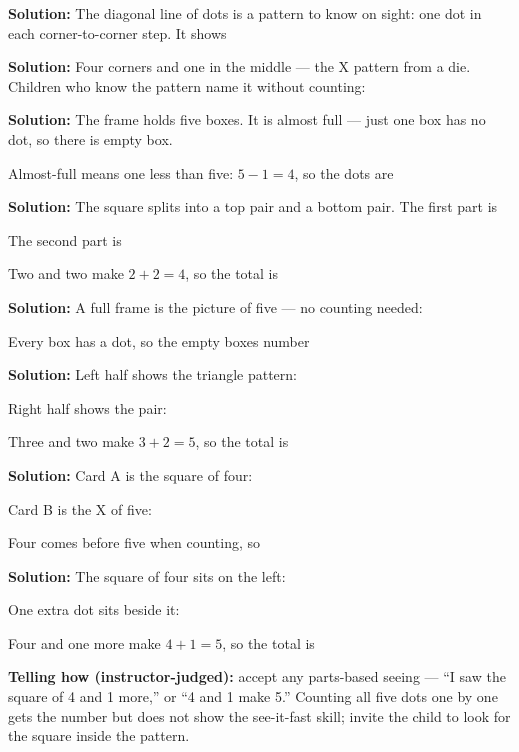 \documentclass[12pt]{article}
\begin{document}



\textbf{Solution:} The diagonal line of dots is a pattern to know on sight:
one dot in each corner-to-corner step. It shows 


\textbf{Solution:} Four corners and one in the middle --- the X pattern from a
die. Children who know the pattern name it without counting: 


\textbf{Solution:} The frame holds five boxes. It is almost full --- just one
box has no dot, so there is  empty box.

Almost-full means one less than five: $5 - 1 = 4$, so the dots are 


\textbf{Solution:} The square splits into a top pair and a bottom pair. The
first part is 

The second part is 

Two and two make $2 + 2 = 4$, so the total is 


\textbf{Solution:} A full frame is the picture of five --- no counting needed:

Every box has a dot, so the empty boxes number 


\textbf{Solution:} Left half shows the triangle pattern: 

Right half shows the pair: 

Three and two make $3 + 2 = 5$, so the total is 


\textbf{Solution:} Card A is the square of four: 

Card B is the X of five: 

Four comes before five when counting, so 


\textbf{Solution:} The square of four sits on the left: 

One extra dot sits beside it: 

Four and one more make $4 + 1 = 5$, so the total is 

\textbf{Telling how (instructor-judged):} accept any parts-based seeing ---
``I saw the square of 4 and 1 more,'' or ``4 and 1 make 5.'' Counting all
five dots one by one gets the number but does not show the see-it-fast skill;
invite the child to look for the square inside the pattern.
\end{document}
